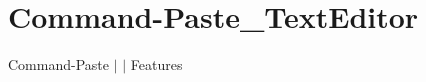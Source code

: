 \chapter{Command-\/\+Paste\+\_\+\+Text\+Editor }
\hypertarget{md__docs_2_text_editor_2_features_2_command-_paste___text_editor}{}\label{md__docs_2_text_editor_2_features_2_command-_paste___text_editor}
Command-\/\+Paste \texorpdfstring{$\vert$}{|}  \texorpdfstring{$\vert$}{|} Features



 
